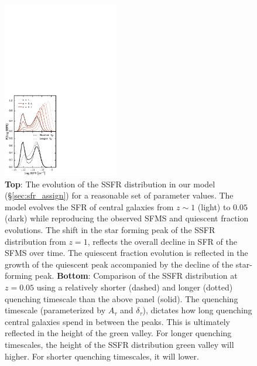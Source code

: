 \documentclass[iop,apj,tighten,twocolappendix,numberedappendix]{emulateapj}
\begin{document}
\begin{figure}
\begin{center}
\includegraphics[width=0.45\textwidth]{figs/SSFRevol.pdf}
\caption{
{\bf Top}: The evolution of the SSFR distribution in 
our model (\S \ref{sec:sfr_assign}) for a reasonable set of 
parameter values. The model evolves the SFR of central
galaxies from $z \sim 1$ (light) to $0.05$ (dark) while reproducing 
the observed SFMS and quiescent fraction evolutions. The shift in 
the star forming peak of the SSFR distribution from $z = 1$, 
reflects the overall decline in SFR of the SFMS over time. 
The quiescent fraction evolution is reflected in the growth 
of the quiescent peak accompanied by the decline of the 
star-forming peak. 
{\bf Bottom}: Comparison of the SSFR distribution at $z = 0.05$ 
using a relatively shorter (dashed) and longer (dotted) quenching 
timescale than the above panel (solid). The quenching timescale 
(parameterized by $A_\tau$ and $\delta_\tau$), dictates how long 
quenching central galaxies spend in between the peaks. This is 
ultimately reflected in the height of the green valley. For longer 
quenching timescales, the height of the SSFR distribution green 
valley will higher. For shorter quenching timescales, it will lower.
}
\label{fig:SSFRevol}
\end{center}
\end{figure}
\end{document}
